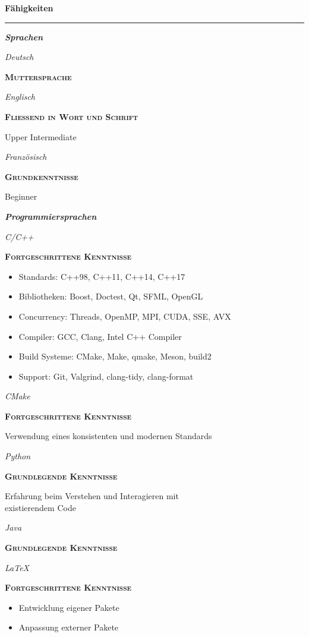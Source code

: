 \documentclass[8pt]{article}
\newcommand{\cvSectionStyle}{%
  \normalfont%
  \Large%
  \color{cvColor}%
  \bfseries%
  \sffamily%
}
\newcommand{\cvSubsectionStyle}{%
  \normalfont%
  \sffamily%
  \itshape%
  \bfseries%
  \color{cvSubsectionColor}%
}
\newcommand{\cvSection}[1]{%
  \smallskip%
  {%
    \cvSectionStyle #1%
  }\\[-0.5em]
  \rule{\linewidth}{0.8pt}%
  \par%
  \smallskip%
}
\newcommand{\cvSubsection}[1]{%
  \begin{tcolorbox}[left=0pt, top=0pt, bottom=0pt, right=0pt, boxsep=5pt, arc=5pt, frame code={}, colback=cvBackgroundColor]
    \cvSubsectionStyle #1%
  \end{tcolorbox}
}
\newenvironment{cvItemize}{%
  \begin{itemize}[itemsep=0mm, leftmargin=4mm]
}{%
  \end{itemize}
}
\newenvironment{cvSkillItem}[2]{
  \par
  \begin{minipage}[c]{0.2\linewidth}
    \raggedleft
    \normalfont
    \sffamily
    \itshape
    #1
  \end{minipage}
  \hspace{0.02\linewidth}
  \vrule
  \hspace{0.02\linewidth}
  \begin{minipage}[t]{0.74\linewidth}
    \sffamily\textsc{\color{cvColor} \textbf{#2}}\par
    \normalfont\footnotesize\sffamily\color{cvContentColor}
}{
  \end{minipage}
  \par%
  \vspace{\baselineskip}%
}
\begin{document}
  \cvSection{Fähigkeiten}
    \cvSubsection{Sprachen}
      \vspace{-1.8em}
      \begin{multicols}{2}
        \begin{cvSkillItem}{Deutsch}{Muttersprache}
        \end{cvSkillItem}
        \begin{cvSkillItem}{Englisch}{Fließend in Wort und Schrift}
          Upper Intermediate
        \end{cvSkillItem}
        \begin{cvSkillItem}{Französisch}{Grundkenntnisse}
          Beginner
        \end{cvSkillItem}
      \end{multicols}

    \cvSubsection{Programmiersprachen}
      \vspace{-1.8em}
      \begin{multicols}{2}
        \begin{cvSkillItem}{C/C++}{Fortgeschrittene Kenntnisse}
          \begin{cvItemize}
            \item Standards: C++98, C++11, C++14, C++17
            \item Bibliotheken: Boost, Doctest, Qt, SFML, OpenGL
            \item Concurrency: Threads, OpenMP, MPI, CUDA, SSE, AVX
            \item Compiler: GCC, Clang, Intel C++ Compiler
            \item Build Systeme: CMake, Make, qmake, Meson, build2
            \item Support: Git, Valgrind, clang-tidy, clang-format
          \end{cvItemize}
        \end{cvSkillItem}
        \begin{cvSkillItem}{CMake}{Fortgeschrittene Kenntnisse}
          Verwendung eines konsistenten und modernen Standards
        \end{cvSkillItem}
        \begin{cvSkillItem}{Python}{Grundlegende Kenntnisse}
          Erfahrung beim  Verstehen und Interagieren mit \\ existierendem Code
        \end{cvSkillItem}
        \begin{cvSkillItem}{Java}{Grundlegende Kenntnisse}
        \end{cvSkillItem}
        \begin{cvSkillItem}{LaTeX}{Fortgeschrittene Kenntnisse}
          \begin{cvItemize}
            \item Entwicklung eigener Pakete
            \item Anpassung externer Pakete
          \end{cvItemize}
        \end{cvSkillItem}
      \end{multicols}
\end{document}
